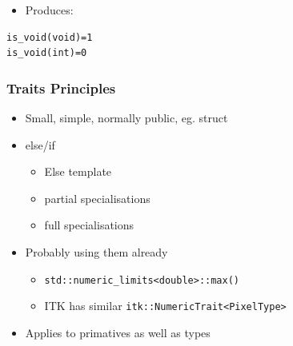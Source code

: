 \begin{Shaded}
\begin{Highlighting}[]

 \NormalTok{<} 
 
     \NormalTok{;}
\NormalTok{\};}

 \NormalTok{<>}
 \NormalTok{> \{}
     \NormalTok{;}
\NormalTok{\};}

 
   
   
   \NormalTok{;}
\NormalTok{\}}
\end{Highlighting}
\end{Shaded}

\begin{itemize}
\itemsep1pt\parskip0pt
\item
  Produces:
\end{itemize}

\begin{verbatim}
is_void(void)=1
is_void(int)=0
\end{verbatim}

\subsubsection{Traits Principles}\label{traits-principles}

\begin{itemize}
\itemsep1pt\parskip0pt
\item
  Small, simple, normally public, eg. struct
\item
  else/if

  \begin{itemize}
  \itemsep1pt\parskip0pt
  \item
    Else template
  \item
    partial specialisations
  \item
    full specialisations
  \end{itemize}
\item
  Probably using them already

  \begin{itemize}
  \itemsep1pt\parskip0pt
  \item
    \texttt{std::numeric\_limits\textless{}double\textgreater{}::max()}
  \item
    ITK has similar
    \texttt{itk::NumericTrait\textless{}PixelType\textgreater{}}
  \end{itemize}
\item
  Applies to primatives as well as types
\end{itemize}

